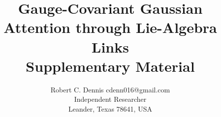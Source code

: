\documentclass[twoside,11pt]{article}
\begin{document}

\title{Gauge-Covariant Gaussian Attention through Lie-Algebra Links\\[6pt]
\large Supplementary Material}

\author{\name Robert C. Dennis \email cdenn016@gmail.com \\
  \addr Independent Researcher\\
  \addr Leander, Texas 78641, USA}


\maketitle



\end{document}
